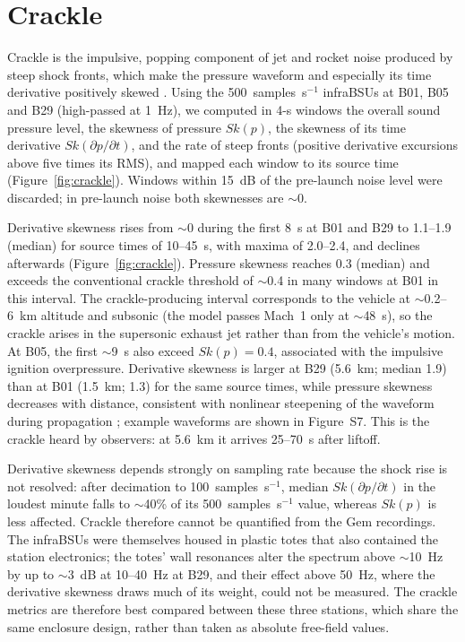 \documentclass[]{seismica}
\newcommand{\suppfig}[1]{Figure~S#1}
\begin{document}
\section{Crackle}
\label{sec:crackle}

Crackle is the impulsive, popping component of jet and rocket noise
produced by steep shock fronts, which make the pressure waveform and
especially its time derivative positively skewed
\citep{FfowcsWilliams1975,Gee2013,McInerny1996}. Using the
500~samples~s$^{-1}$ infraBSUs at B01, B05 and B29 (high-passed at
1~Hz), we computed in 4-s windows the overall sound pressure level, the
skewness of pressure $Sk(p)$, the skewness of its time derivative
$Sk(\partial p/\partial t)$, and the rate of steep fronts (positive
derivative excursions above five times its RMS), and mapped each window
to its source time (Figure~\ref{fig:crackle}). Windows within 15~dB of
the pre-launch noise level were discarded; in pre-launch noise both
skewnesses are $\sim$0.

Derivative skewness rises from $\sim$0 during the first 8~s at B01 and
B29 to 1.1--1.9 (median) for source times of 10--45~s, with maxima of
2.0--2.4, and declines afterwards (Figure~\ref{fig:crackle}). Pressure
skewness reaches 0.3 (median) and exceeds the conventional crackle
threshold of $\sim$0.4 \citep{FfowcsWilliams1975} in many windows at
B01 in this interval. The crackle-producing interval corresponds to the
vehicle at $\sim$0.2--6~km altitude and subsonic (the model passes
Mach~1 only at $\sim$48~s), so the crackle arises in the supersonic
exhaust jet rather than from the vehicle's motion. At B05, the
first $\sim$9~s also exceed $Sk(p) = 0.4$, associated with the impulsive
ignition overpressure. Derivative skewness is larger at B29 (5.6~km;
median 1.9) than at B01 (1.5~km; 1.3) for the same source times, while
pressure skewness decreases with distance, consistent with nonlinear
steepening of the waveform during propagation \citep{Gee2008}; example
waveforms are shown in \suppfig{7}. This is the crackle heard by
observers: at 5.6~km it arrives 25--70~s after liftoff.

Derivative skewness depends strongly on sampling rate because the shock
rise is not resolved: after decimation to 100~samples~s$^{-1}$, median
$Sk(\partial p/\partial t)$ in the loudest minute falls to
$\sim$40\% of its 500~samples~s$^{-1}$ value, whereas $Sk(p)$ is less
affected. Crackle therefore cannot be quantified from the Gem
recordings. The infraBSUs were themselves housed in plastic totes that also
contained the station electronics; the totes' wall resonances alter the
spectrum above $\sim$10~Hz by up to $\sim$3~dB at 10--40~Hz at B29, and
their effect above 50~Hz, where the derivative skewness draws much of its
weight, could not be measured. The crackle metrics are therefore best
compared between these three stations, which share the same enclosure
design, rather than taken as absolute free-field values.
\end{document}
